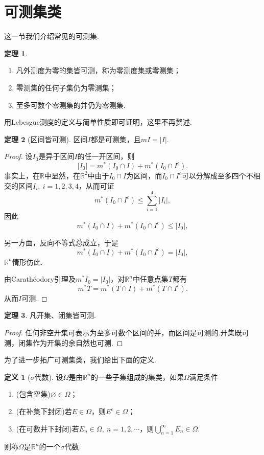\documentclass[lang=cn,12pt]{ctexart}
\theoremstyle{definition}
\newtheorem{definition}{定义}
\newtheorem{theorem}{定理}
\theoremstyle{plain}
\begin{document}
\section{可测集类}
这一节我们介绍常见的可测集.
\begin{theorem}
	\begin{enumerate}
		\item 凡外测度为零的集皆可测，称为{\heiti 零测度集}或{\heiti 零测集}；
		\item 零测集的任何子集仍为零测集；
		\item 至多可数个零测集的并仍为零测集.
	\end{enumerate}
\end{theorem}
用Lebesgue测度的定义与简单性质即可证明，这里不再赘述.
\begin{theorem}[区间皆可测]
	区间$I$都是可测集，且$mI=|I|$.
\end{theorem}
\begin{proof}
	设$I_0$是异于区间$I$的任一开区间，则
	$$|I_0|=m^*(I_0\cap I)+m^*(I_0\cap I^c).$$
	事实上，在$\mathbb{R}$中显然，在$\mathbb{R}^2$中由于$I_0\cap I$为区间，而$I_0\cap I^c$可以分解成至多四个不相交的区间$I_i,\ i=1,2,3,4$，从而可证
	$$m^*(I_0\cap I^c)\leqslant\sum_{i=1}^{4}|I_i|,$$
	因此
	$$m^*(I_0\cap I)+m^*(I_0\cap I^c)\leqslant|I_0|,$$
	
	另一方面，反向不等式总成立，于是
	$$m^*(I_0\cap I)+m^*(I_0\cap I^c)=|I_0|,$$
	$\mathbb{R}^n$情形仿此.
	
	由Carath\'eodory引理及$m^*I_0=|I_0|$，对$\mathbb{R}^n$中任意点集$T$都有
	$$m^*T=m^*(T\cap I)+m^*(T\cap I^c).$$
	从而$I$可测.
\end{proof}
\begin{theorem}
	凡开集、闭集皆可测.
\end{theorem}
\begin{proof}
	任何非空开集可表示为至多可数个区间的并，而区间是可测的.开集既可测，闭集作为开集的余自然也可测.
\end{proof}
为了进一步拓广可测集类，我们给出下面的定义.
\begin{definition}[$\sigma$代数]
	设$\varOmega$是由$\mathbb{R}^n$的一些子集组成的集类，如果$\varOmega$满足条件
	\begin{enumerate}
		\item (包含空集)$\varnothing\in\varOmega$；
		\item (在补集下封闭)若$E\in\Omega$，则$E^c\in\varOmega$；
		\item (在可数并下封闭)若$E_n\in\varOmega,\ n=1,2,\cdots$，则$\bigcup\limits_{n=1}^{\infty}E_n\in\varOmega$.
	\end{enumerate}
	则称$\varOmega$是$\mathbb{R}^n$的一个$\sigma${\heiti 代数}.
\end{definition}
\end{document}

